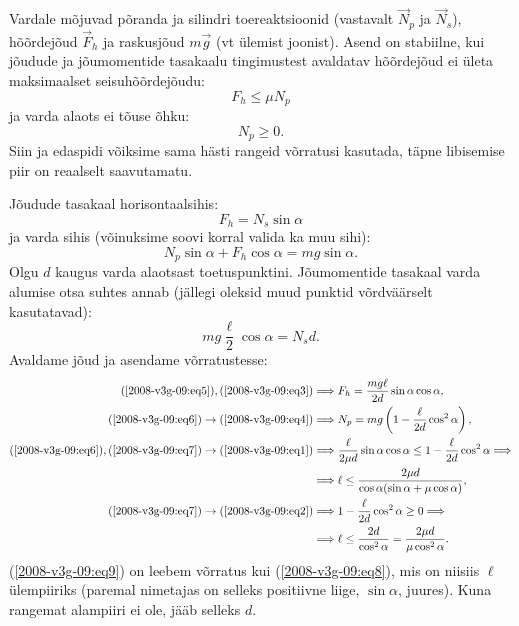\documentclass[10pt, twoside]{article}
\begin{document}
{Vardale mõjuvad põranda ja silindri toereaktsioonid (vastavalt $\vec N_p$ ja $\vec N_s$), hõõrdejõud $\vec F_h$ ja raskusjõud $m\vec g$ (vt ülemist joonist). Asend on stabiilne, kui jõudude ja jõumomentide tasakaalu tingimustest avaldatav hõõrdejõud ei ületa maksimaalset seisuhõõrdejõudu:
\begin{equation} \label{2008-v3g-09:eq1}
F_{h} \leq \mu N_{p}
\end{equation}
ja varda alaots ei tõuse õhku:
\begin{equation} \label{2008-v3g-09:eq2}
N_p \geq 0.
\end{equation}
Siin ja edaspidi võiksime sama hästi rangeid võrratusi kasutada, täpne libisemise piir on reaalselt saavutamatu.

Jõudude tasakaal horisontaalsihis:
\begin{equation} \label{2008-v3g-09:eq3}
F_h = N_s \sin \alpha
\end{equation}
ja varda sihis (võinuksime soovi korral valida ka muu sihi):
\begin{equation} \label{2008-v3g-09:eq4}
N_p \sin \alpha + F_h \cos \alpha = mg \sin \alpha.
\end{equation}
Olgu $d$ kaugus varda alaotsast toetuspunktini. Jõumomentide tasakaal varda alumise otsa suhtes annab (jällegi oleksid muud punktid võrdväärselt kasutatavad):
\begin{equation} \label{2008-v3g-09:eq5}
mg \frac{\ell}{2} \cos \alpha = N_sd.
\end{equation}
Avaldame jõud ja asendame võrratustesse:
\begin{align}
	(\ref{2008-v3g-09:eq5}),(\ref{2008-v3g-09:eq3}) & \Longrightarrow F_{h}=\frac{m g \ell}{2 d} \sin \alpha \cos \alpha, \label{2008-v3g-09:eq6}\\
	(\ref{2008-v3g-09:eq6}) \rightarrow(\ref{2008-v3g-09:eq4}) & \Longrightarrow N_{p}=m g\left(1-\frac{\ell}{2 d} \cos ^{2} \alpha\right),\label{2008-v3g-09:eq7} \\
	(\ref{2008-v3g-09:eq6}),(\ref{2008-v3g-09:eq7}) \rightarrow(\ref{2008-v3g-09:eq1}) & \Longrightarrow \frac{\ell}{2 \mu d} \sin \alpha \cos \alpha \leq 1-\frac{\ell}{2 d} \cos ^{2} \alpha \Longrightarrow\nonumber \\ 
	& \Longrightarrow \ell \leq \frac{2 \mu d}{\cos \alpha(\sin \alpha+\mu \cos \alpha)},\label{2008-v3g-09:eq8} \\
	(\ref{2008-v3g-09:eq7}) \rightarrow(\ref{2008-v3g-09:eq2}) & \Longrightarrow 1-\frac{\ell}{2 d} \cos ^{2} \alpha \geq 0 \Longrightarrow\nonumber \\ 
	& \Longrightarrow \ell \leq \frac{2 d}{\cos ^{2} \alpha}=\frac{2 \mu d}{\mu \cos ^{2} \alpha}. \label{2008-v3g-09:eq9}
\end{align}
(\ref{2008-v3g-09:eq9}) on leebem võrratus kui (\ref{2008-v3g-09:eq8}), mis on niisiis $\ell $ ülempiiriks (paremal nimetajas on selleks positiivne liige, $\sin \alpha$, juures). Kuna rangemat alampiiri ei ole, jääb selleks $d$.

}
\end{document}
